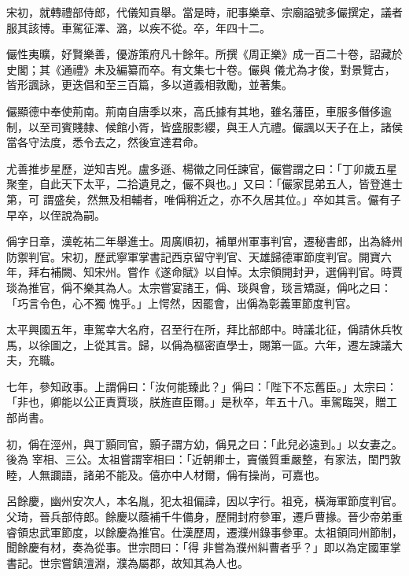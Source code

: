 \begin{pinyinscope}
 宋初，就轉禮部侍郎，代儀知貢舉。當是時，祀事樂章、宗廟謚號多儼撰定，議者服其該博。車駕征澤、潞，以疾不從。卒，年四十二。



 儼性夷曠，好賢樂善，優游策府凡十餘年。所撰《周正樂》成一百二十卷，詔藏於史閣；其《通禮》未及編纂而卒。有文集七十卷。儼與
 儀尤為才俊，對景覽古，皆形諷詠，更迭倡和至三百篇，多以道義相敦勵，並著集。



 儼顯德中奉使荊南。荊南自唐季以來，高氏據有其地，雖名藩臣，車服多僭侈逾制，以至司賓賤隸、候館小胥，皆盛服彯纓，與王人亢禮。儼諷以天子在上，諸侯當各守法度，悉令去之，然後宣達君命。



 尤善推步星歷，逆知吉兇。盧多遜、楊徽之同任諫官，儼嘗謂之曰：「丁卯歲五星聚奎，自此天下太平，二拾遺見之，儼不與也。」又曰：「儼家昆弟五人，皆登進士第，可
 謂盛矣，然無及相輔者，唯偁稍近之，亦不久居其位。」卒如其言。儼有子早卒，以侄說為嗣。



 偁字日章，漢乾祐二年舉進士。周廣順初，補單州軍事判官，遷秘書郎，出為絳州防禦判官。宋初，歷武寧軍掌書記西京留守判官、天雄歸德軍節度判官。開寶六年，拜右補闕、知宋州。嘗作《遂命賦》以自悼。太宗領開封尹，選偁判官。時賈琰為推官，偁不樂其為人。太宗嘗宴諸王，偁、琰與會，琰言矯誕，偁叱之曰：「巧言令色，心不獨
 愧乎。」上愕然，因罷會，出偁為彰義軍節度判官。



 太平興國五年，車駕幸大名府，召至行在所，拜比部郎中。時議北征，偁請休兵牧馬，以徐圖之，上從其言。歸，以偁為樞密直學士，賜第一區。六年，遷左諫議大夫，充職。



 七年，參知政事。上謂偁曰：「汝何能臻此？」偁曰：「陛下不忘舊臣。」太宗曰：「非也，卿能以公正責賈琰，朕旌直臣爾。」是秋卒，年五十八。車駕臨哭，贈工部尚書。



 初，偁在涇州，與丁顥同官，顥子謂方幼，偁見之曰：「此兒必遠到。」以女妻之。後為
 宰相、三公。太祖嘗謂宰相曰：「近朝卿士，竇儀質重嚴整，有家法，閨門敦睦，人無讕語，諸弟不能及。僖亦中人材爾，偁有操尚，可嘉也。



 呂餘慶，幽州安次人，本名胤，犯太祖偏諱，因以字行。祖兗，橫海軍節度判官。父琦，晉兵部侍郎。餘慶以蔭補千牛備身，歷開封府參軍，遷戶曹掾。晉少帝弟重睿領忠武軍節度，以餘慶為推官。仕漢歷周，遷濮州錄事參軍。太祖領同州節制，聞餘慶有材，奏為從事。世宗問曰：「得
 非嘗為濮州糾曹者乎？」即以為定國軍掌書記。世宗嘗鎮澶淵，濮為屬郡，故知其為人也。




\end{pinyinscope}
